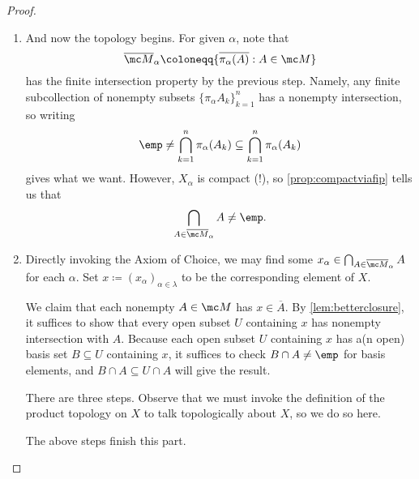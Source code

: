 \documentclass[../notes.tex]{subfiles}
\begin{document}
\begin{proof}
\begin{enumerate}
		\item And now the topology begins. For given $\alpha$, note that
		\[\overline{\mc M}_\alpha\coloneqq\{\overline{\pi_\alpha(A)}:A\in\mc M\}\]
		has the finite intersection property by the previous step. Namely, any finite subcollection of nonempty subsets $\{\pi_\alpha A_k\}_{k=1}^n$ has a nonempty intersection, so writing
		\[\emp\ne\bigcap_{k=1}^n\pi_\alpha(A_k)\subseteq\bigcap_{k=1}^n\pi_\alpha(A_k)\]
		gives what we want. However, $X_\alpha$ is compact (!), so \autoref{prop:compactviafip} tells us that
		\[\bigcap_{A\in\overline{\mc M}_\alpha}A\ne\emp.\]
		
		\item Directly invoking the Axiom of Choice, we may find some $x_\alpha\in\bigcap_{A\in\overline{\mc M}_\alpha}A$ for each $\alpha$. Set $x\coloneqq(x_\alpha)_{\alpha\in\lambda}$ to be the corresponding element of $X$.

		We claim that each nonempty $A\in\mc M$ has $x\in\overline A$. By \autoref{lem:betterclosure}, it suffices to show that every open subset $U$ containing $x$ has nonempty intersection with $A$. Because each open subset $U$ containing $x$ has a(n open) basis set $B\subseteq U$ containing $x$, it suffices to check $B\cap A\ne\emp$ for basis elements, and $B\cap A\subseteq U\cap A$ will give the result.
		
		There are three steps. Observe that we must invoke the definition of the product topology on $X$ to talk topologically about $X$, so we do so here.
		The above steps finish this part.


\end{enumerate}
\end{proof}
\end{document}
